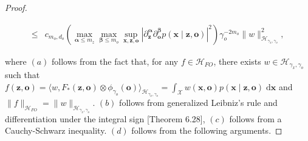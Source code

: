 \documentclass[11pt]{article}
\newcommand{\bx}{\mathbf x}
\newcommand{\bz}{\mathbf z}
\newcommand{\bo}{\mathbf o}
\newcommand{\calH}{\mathcal{H}}
\newcommand{\calX}{\mathcal{X}}
\newcommand{\0}{\mathbf{0}}
\newcommand{\balpha}{\boldsymbol\alpha}
\newcommand{\bbeta}{\boldsymbol\beta}
\begin{document}
\begin{appendix}
\begin{proof}
\begin{small}
\begin{align*}
    \leq & c_{m_o,d_o} \left(\max_{\balpha\leq m_z}\max_{\bbeta\leq m_o}\sup_{\bx,\bz,\bo}\left|\partial^{\balpha}_{\bz}\partial^{\bbeta}_{\bo}p(\bx\mid \bz,\bo)\right|^2\right)  \gamma_o^{-2m_o} \|w\|_{\calH_{\gamma_x,\gamma_o}}^2 ,
\end{align*}
\end{small}
where $(a)$ follows from the fact that, for any $f\in\calH_{FO}$, there exists $w\in\calH_{\gamma_x,\gamma_o}$ such that $f(\bz,\bo) = \langle w, F_{\ast}(\bz,\bo)\otimes\phi_{\gamma_o}(\bo)\rangle_{\calH_{\gamma_x,\gamma_o}} = \int_{\calX}w(\bx,\bo)p(\bx\mid \bz,\bo)\;\mathrm{d}\bx$ and $\|f\|_{\calH_{FO}} = \|w\|_{\calH_{\gamma_x,\gamma_o}}$.
$(b)$ follows from generalized Leibniz's rule and differentiation under the integral sign \cite{klenke2013probability}[Theorem 6.28], $(c)$ follows from a Cauchy-Schwarz inequality.
$(d)$ follows from the following arguments.


\end{proof}
\end{appendix}
\end{document}
